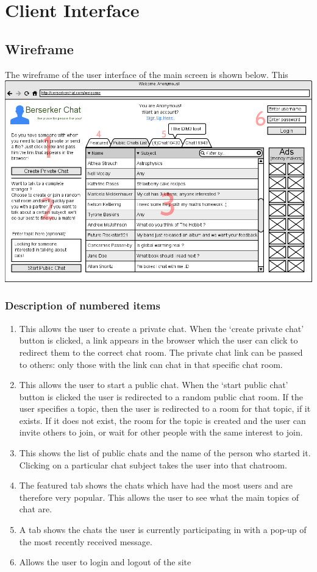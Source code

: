 \documentclass{sig-alt-release2}
\begin{document}
\section{Client Interface}

\subsection{Wireframe}
The wireframe of the user interface of the main screen is shown below. This \\

\includegraphics[scale=0.25]{wireframe_num.jpg}
\\
\subsubsection{Description of numbered items}
\begin{enumerate}
\item This allows the user to create a private chat. When the `create private chat' button is clicked, a link appears in the browser which the user can click to redirect them to the correct chat room. The private chat link can be passed to others: only those with the link can chat in that specific chat room. 
\item This allows the user to start a public chat. When the `start public chat' button is clicked the user is redirected to a random public chat room. If the user specifies a topic, then the user is redirected to a room for that topic, if it exists. If it does not exist, the room for the topic is created and the user can invite others to join, or wait for other people with the same interest to join.
\item This shows the list of public chats and the name of the person who started it. Clicking on a particular chat subject takes the user into that chatroom. 
\item The featured tab shows the chats which have had the most users and are therefore very popular. This allows the user to see what the main topics of chat are.
\item A tab shows the chats the user is currently participating in with a pop-up of the most recently received message.
\item Allows the user to login and logout of the site
\end{enumerate}
\end{document}

